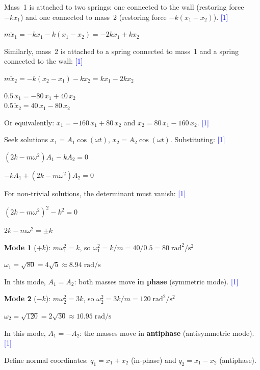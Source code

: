 \documentclass[12pt,a4paper]{article}
\newcommand{\markstep}[1]{\hfill\textcolor{blue}{[#1]}}
\newcommand{\finalanswer}[1]{%
  \begin{tcolorbox}[colback=green!5!white,colframe=green!50!black,boxrule=0.5pt]
  #1
  \end{tcolorbox}
}
\begin{document}
\begin{parts}

\item Mass~1 is attached to two springs: one connected to the wall (restoring force $-kx_1$) and one connected to mass~2 (restoring force $-k(x_1 - x_2)$). \markstep{1}

$m\ddot{x}_1 = -kx_1 - k(x_1 - x_2) = -2kx_1 + kx_2$

Similarly, mass~2 is attached to a spring connected to mass~1 and a spring connected to the wall: \markstep{1}

$m\ddot{x}_2 = -k(x_2 - x_1) - kx_2 = kx_1 - 2kx_2$

\finalanswer{%
$0.5\,\ddot{x}_1 = -80\,x_1 + 40\,x_2$\\[4pt]
$0.5\,\ddot{x}_2 = 40\,x_1 - 80\,x_2$
}

Or equivalently: $\ddot{x}_1 = -160\,x_1 + 80\,x_2$ and $\ddot{x}_2 = 80\,x_1 - 160\,x_2$. \markstep{1}

\item Seek solutions $x_1 = A_1\cos(\omega t)$, $x_2 = A_2\cos(\omega t)$. Substituting: \markstep{1}

$(2k - m\omega^2)A_1 - kA_2 = 0$

$-kA_1 + (2k - m\omega^2)A_2 = 0$

For non-trivial solutions, the determinant must vanish: \markstep{1}

$(2k - m\omega^2)^2 - k^2 = 0$

$2k - m\omega^2 = \pm k$

\textbf{Mode 1} ($+k$): $m\omega_1^2 = k$, so $\omega_1^2 = k/m = 40/0.5 = 80\;\text{rad}^2/\text{s}^2$

\finalanswer{$\omega_1 = \sqrt{80} = 4\sqrt{5} \approx 8.94\;\text{rad/s}$}

In this mode, $A_1 = A_2$: both masses move \textbf{in phase} (symmetric mode). \markstep{1}

\textbf{Mode 2} ($-k$): $m\omega_2^2 = 3k$, so $\omega_2^2 = 3k/m = 120\;\text{rad}^2/\text{s}^2$

\finalanswer{$\omega_2 = \sqrt{120} = 2\sqrt{30} \approx 10.95\;\text{rad/s}$}

In this mode, $A_1 = -A_2$: the masses move in \textbf{antiphase} (antisymmetric mode). \markstep{1}

\item Define normal coordinates: $q_1 = x_1 + x_2$ (in-phase) and $q_2 = x_1 - x_2$ (antiphase).


\end{parts}
\end{document}
